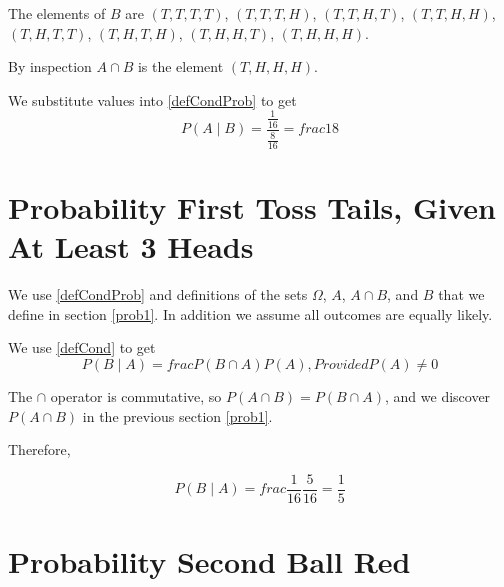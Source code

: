 \documentclass[a4paper,11pt]{article}
\begin{document}
The elements of $B$ are $ \left(T, T, T, T \right) $,
$ \left(T, T, T, H \right) $, $ \left(T, T, H, T \right) $,
$ \left(T, T, H, H \right) $, $ \left(T, H, T, T \right) $,
$ \left(T, H, T, H \right) $, $ \left(T, H, H, T \right) $,
$ \left(T, H, H, H \right) $.

By inspection $ A \cap B $ is the element $\left( T, H, H, H \right)$.

We substitute values into \ref{defCondProb} to get
\begin{equation}
  P \left( A \mid B \right) = \frac {\frac{1}{16}} {\frac{8}{16}} = 
    frac{1}{8}
\end{equation}

\section{Probability First Toss Tails, Given At Least 3 Heads}

We use \ref{defCondProb} and definitions of the sets $\Omega$, $A$, 
$A \cap B$, and $B$ that we define in section \ref{prob1}. In addition
we assume all outcomes are equally likely.

We use \ref{defCond} to get
\begin{equation}
P \left( B \mid A \right) = frac{P \left( B \cap A \right)}
  { P \left( A \right) }, Provided P\left( A \right) \neq 0
\end{equation}

The $\cap$ operator is commutative, so $P \left( A \cap B \right)
 = P \left( B \cap A \right)$, and we discover 
 $P \left( A \cap B \right)$ in the previous section \ref{prob1}.
 
Therefore,

\begin{equation}
P \left( B \mid A \right) = frac{ \frac{1}{16} }{ \frac{5}{16} }
  = \frac{1}{5}
\end{equation}

\section{Probability Second Ball Red}
 
\printbibliography{}
\end{document}
